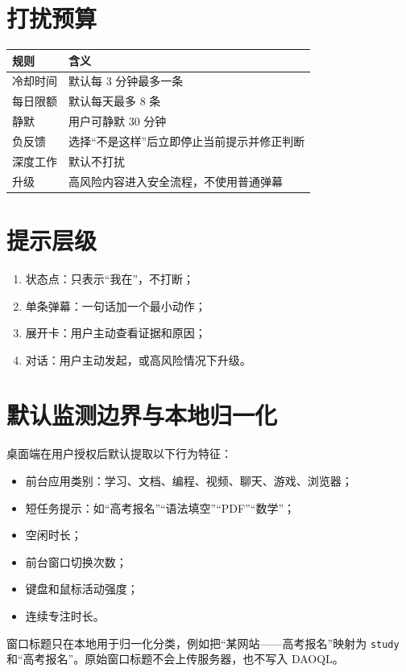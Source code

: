 \documentclass[UTF8,a4paper,11pt]{ctexart}
\begin{document}
\section{打扰预算}

\begin{longtable}{@{}p{4.2cm}p{7.5cm}@{}}
\toprule
规则 & 含义 \\
\midrule
冷却时间 & 默认每 3 分钟最多一条 \\
每日限额 & 默认每天最多 8 条 \\
静默 & 用户可静默 30 分钟 \\
负反馈 & 选择“不是这样”后立即停止当前提示并修正判断 \\
深度工作 & 默认不打扰 \\
升级 & 高风险内容进入安全流程，不使用普通弹幕 \\
\bottomrule
\end{longtable}

\section{提示层级}

\begin{enumerate}[leftmargin=2em]
\item 状态点：只表示“我在”，不打断；
\item 单条弹幕：一句话加一个最小动作；
\item 展开卡：用户主动查看证据和原因；
\item 对话：用户主动发起，或高风险情况下升级。
\end{enumerate}

\section{默认监测边界与本地归一化}

桌面端在用户授权后默认提取以下行为特征：

\begin{itemize}[leftmargin=2em]
\item 前台应用类别：学习、文档、编程、视频、聊天、游戏、浏览器；
\item 短任务提示：如“高考报名”“语法填空”“PDF”“数学”；
\item 空闲时长；
\item 前台窗口切换次数；
\item 键盘和鼠标活动强度；
\item 连续专注时长。
\end{itemize}

窗口标题只在本地用于归一化分类，例如把“某网站——高考报名”映射为 \texttt{study} 和“高考报名”。原始窗口标题不会上传服务器，也不写入 DAOQL。
\end{document}
